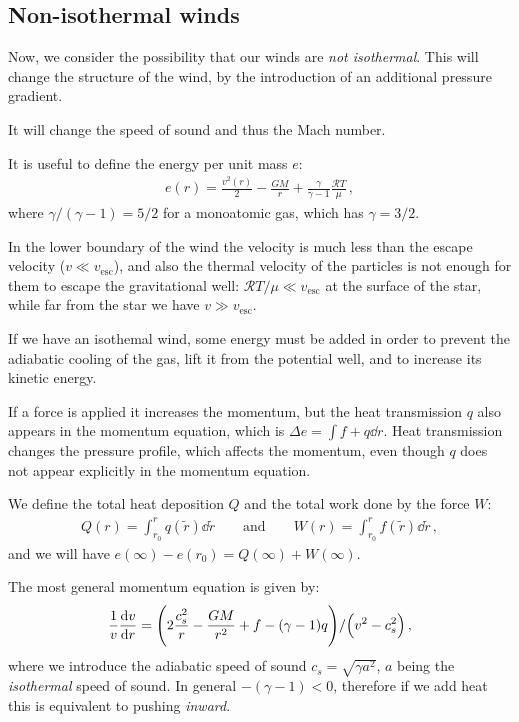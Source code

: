 \documentclass[main.tex]{subfiles}
\begin{document}

\subsection{Non-isothermal winds}

Now, we consider the possibility that our winds are \emph{not isothermal}.
This will change the structure of the wind, by the introduction of an additional pressure gradient.

It will change the speed of sound and thus the Mach number.

It is useful to define the energy per unit mass \(e\): 
%
\begin{align}
  e(r) = \frac{v^2(r)}{2} - \frac{GM}{r} + \frac{\gamma }{\gamma -1} \frac{ \mathcal{R} T}{\mu }
\,,
\end{align}
%
where \(\gamma / (\gamma -1) = 5/2\) for a monoatomic gas, which has \(\gamma = 3/2\).

In the lower boundary of the wind the velocity is much less than the escape velocity (\(v \ll v _{\text{esc}}\)), and also the thermal velocity of the particles is not enough for them to escape the gravitational well: \(\mathcal{R} T / \mu \ll v _{\text{esc}}\) at the surface of the star, while far from the star we have \(v \gg v _{\text{esc}}\).

If we have an isothemal wind, some energy must be added in order to prevent the adiabatic cooling of the gas, lift it from the potential well, and to increase its kinetic energy.

If a force is applied it increases the momentum, but the heat transmission \(q\) also appears in the momentum equation, which is \(\Delta e = \int f + q \dd{r} \).
Heat transmission changes the pressure profile, which affects the momentum, even though \(q\) does not appear explicitly in the momentum equation.

We define the total heat deposition \(Q\) and the total work done by the force \(W\):
%
\begin{align}
Q(r) = \int_{r_0 }^{r} q(\widetilde{r}) \dd{\widetilde{r}}
\qquad \text{and} \qquad
W(r) = \int_{r_0 }^{r} f(\widetilde{r}) \dd{\widetilde{r}}
\,,
\end{align}
%
and we will have \(e( \infty ) - e(r_0 ) = Q( \infty ) + W( \infty )\). 

The most general momentum equation is given by: 
%
\begin{align}
  \frac{1}{v} \dv{v}{r} = \qty(2 \frac{c_s^2}{r} - \frac{GM}{r^2} + f -(\gamma - 1) q) / \qty(v^2- c_s^2)
\,,
\end{align}
%
where we introduce the adiabatic speed of sound \(c_s = \sqrt{\gamma a^2} \), \(a\) being the \emph{isothermal} speed of sound.
In general \(- (\gamma - 1)<0\), therefore if we add heat this is equivalent to pushing \emph{inward}.
\end{document}
